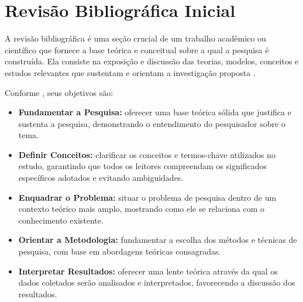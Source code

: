 \section{Revisão Bibliográfica Inicial}\label{sec:revisao_bib}

A revisão bibliográfica é uma seção crucial de um trabalho acadêmico ou científico que fornece a base teórica e conceitual sobre a qual a pesquisa é construída. Ela consiste na exposição e discussão das teorias, modelos, conceitos e estudos relevantes que sustentam e orientam a investigação proposta \cite{Marconi2022}.

\newpage

Conforme , seus objetivos são:
\begin{itemize}[nosep, leftmargin=2.5cm]
    \item \textbf{Fundamentar a Pesquisa:} oferecer uma base teórica sólida que justifica e sustenta a pesquisa, demonstrando o entendimento do pesquisador sobre o tema.
    \item \textbf{Definir Conceitos:} clarificar os conceitos e termos-chave utilizados no estudo, garantindo que todos os leitores compreendam os significados específicos adotados e evitando ambiguidades.
    \item \textbf{Enquadrar o Problema:} situar o problema de pesquisa dentro de um contexto teórico mais amplo, mostrando como ele se relaciona com o conhecimento existente.
    \item \textbf{Orientar a Metodologia:} fundamentar a escolha dos métodos e técnicas de pesquisa, com base em abordagens teóricas consagradas.
    \item \textbf{Interpretar Resultados:} oferecer uma lente teórica através da qual os dados coletados serão analisados e interpretados, favorecendo a discussão dos resultados.
\end{itemize}

